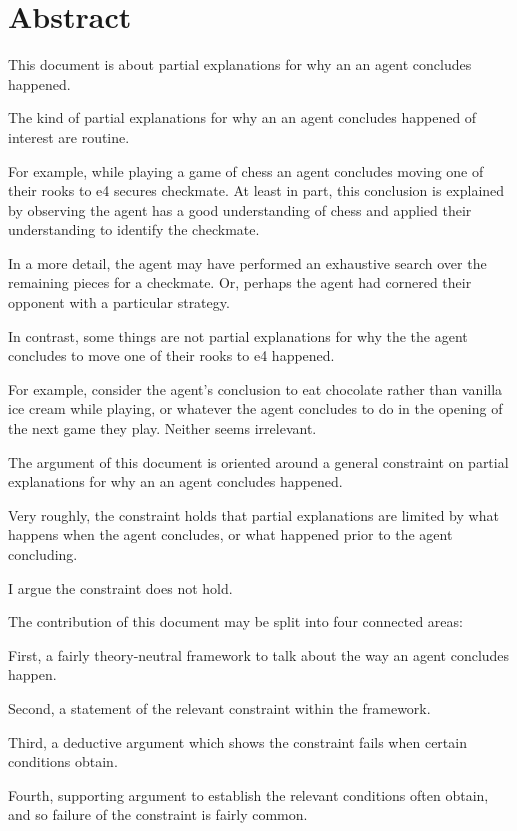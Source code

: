 \chapter*{Abstract}
\label{cha:abstract}

\begin{note}
  This document is about partial explanations for why an \eiw{} an agent concludes happened.
\end{note}

\begin{note}
  The kind of partial explanations for why an \eiw{} an agent concludes happened of interest are routine.

  For example, while playing a game of chess an agent concludes moving one of their rooks to e4 secures checkmate.
  At least in part, this conclusion is explained by observing the agent has a good understanding of chess and applied their understanding to identify the checkmate.

  In a more detail, the agent may have performed an exhaustive search over the remaining pieces for a checkmate.
  Or, perhaps the agent had cornered their opponent with a particular strategy.

  In contrast, some things are not partial explanations for why the \eiw{} the agent concludes to move one of their rooks to e4 happened.

  For example, consider the agent's conclusion to eat chocolate rather than vanilla ice cream while playing, or whatever the agent concludes to do in the opening of the next game they play.
  Neither seems irrelevant.
\end{note}

\begin{note}
  The argument of this document is oriented around a general constraint on partial explanations for why an \eiw{} an agent concludes happened.

  Very roughly, the constraint holds that partial explanations are limited by what happens when the agent concludes, or what happened prior to the agent concluding.

  I argue the constraint does not hold.
\end{note}

\begin{note}
  The contribution of this document may be split into four connected areas:

  First, a fairly theory-neutral framework to talk about the way  an agent concludes happen.

  Second, a statement of the relevant constraint within the framework.

  Third, a deductive argument which shows the constraint fails when certain conditions obtain.

  Fourth, supporting argument to establish the relevant conditions often obtain, and so failure of the constraint is fairly common.
\end{note}


